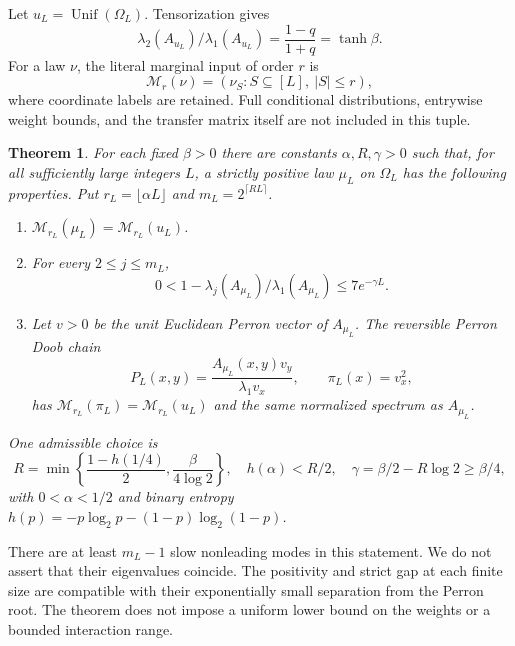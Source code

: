 \documentclass[11pt]{article}
\newtheorem{theorem}{Theorem}
\newcommand{\Unif}{\operatorname{Unif}}
\begin{document}
Let $u_L=\Unif(\Omega_L)$. Tensorization gives
\begin{equation}\label{eq:product}
 \lambda_2(A_{u_L})/\lambda_1(A_{u_L})
       =\frac{1-q}{1+q}=\tanh\beta.
\end{equation}
For a law $\nu$, the literal marginal input of order $r$ is
\begin{equation}\label{eq:input}
 \mathcal M_r(\nu)=(\nu_S:S\subseteq[L],\ |S|\le r),
\end{equation}
where coordinate labels are retained. Full conditional distributions,
entrywise weight bounds, and the transfer matrix itself are not included
in this tuple.

\begin{theorem}\label{thm:main}
For each fixed $\beta>0$ there are constants $\alpha,R,\gamma>0$ such
that, for all sufficiently large integers $L$, a strictly positive law
$\mu_L$ on $\Omega_L$ has the following properties. Put
$r_L=\lfloor\alpha L\rfloor$ and $m_L=2^{\lceil RL\rceil}$.
\begin{enumerate}
\item $\mathcal M_{r_L}(\mu_L)=\mathcal M_{r_L}(u_L)$.
\item For every $2\le j\le m_L$,
\begin{equation}\label{eq:slow}
 0<1-\lambda_j(A_{\mu_L})/\lambda_1(A_{\mu_L})
                 \le 7e^{-\gamma L}.
\end{equation}
\item Let $v>0$ be the unit Euclidean Perron vector of $A_{\mu_L}$.
The reversible Perron Doob chain
\begin{equation}\label{eq:doob}
 P_L(x,y)=\frac{A_{\mu_L}(x,y)v_y}{\lambda_1 v_x},
 \qquad \pi_L(x)=v_x^2,
\end{equation}
has $\mathcal M_{r_L}(\pi_L)=\mathcal M_{r_L}(u_L)$ and the same
normalized spectrum as $A_{\mu_L}$.
\end{enumerate}
One admissible choice is
\begin{equation}\label{eq:parameters}
 R=\min\left\{\frac{1-h(1/4)}2,\frac{\beta}{4\log 2}\right\},
 \quad h(\alpha)<R/2,\quad
 \gamma=\beta/2-R\log 2\ge\beta/4,
\end{equation}
with $0<\alpha<1/2$ and binary entropy
$h(p)=-p\log_2p-(1-p)\log_2(1-p)$.
\end{theorem}

There are at least $m_L-1$ slow nonleading modes in this statement.
We do not assert that their eigenvalues coincide. The positivity and
strict gap at each finite size are compatible with their exponentially
small separation from the Perron root. The theorem does not impose a
uniform lower bound on the weights or a bounded interaction range.
\end{document}
